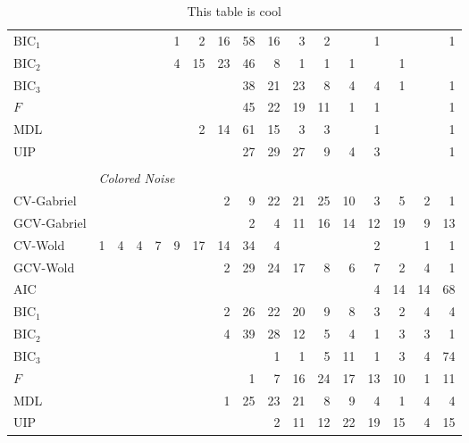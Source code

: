\begin{table}
\begin{tabular}{lrrrrrrrrrrrrrrrr}
 BIC$_1$ &  &  &  &  &  1 &  2 &  16 &  58 &  16 &  3 &  2 &  &  1 &  &  &  1\\ 
 BIC$_2$ &  &  &  &  &  4 &  15 &  23 &  46 &  8 &  1 &  1 &  1 &  &  1 &  & \\ 
 BIC$_3$ &  &  &  &  &  &  &  &  38 &  21 &  23 &  8 &  4 &  4 &  1 &  &  1\\ 
 $F$ &  &  &  &  &  &  &  &  45 &  22 &  19 &  11 &  1 &  1 &  &  &  1\\ 
 MDL &  &  &  &  &  &  2 &  14 &  61 &  15 &  3 &  3 &  &  1 &  &  &  1\\ 
 UIP &  &  &  &  &  &  &  &  27 &  29 &  27 &  9 &  4 &  3 &  &  &  1\\ 
        \\
        &\multicolumn{16}{l}{\scriptsize{\textit{Colored Noise}}} \\
CV-Gabriel &  &  &  &  &  &  &  2 &  9 &  22 &  21 &  25 &  10 &  3 &  5 &  2 &  1\\ 
 GCV-Gabriel &  &  &  &  &  &  &  &  2 &  4 &  11 &  16 &  14 &  12 &  19 &  9 &  13\\ 
 CV-Wold &  1 &  4 &  4 &  7 &  9 &  17 &  14 &  34 &  4 &  &  &  &  2 &  &  1 &  1\\ 
 GCV-Wold &  &  &  &  &  &  &  2 &  29 &  24 &  17 &  8 &  6 &  7 &  2 &  4 &  1\\ 
 AIC &  &  &  &  &  &  &  &  &  &  &  &  &  4 &  14 &  14 &  68\\ 
 BIC$_1$ &  &  &  &  &  &  &  2 &  26 &  22 &  20 &  9 &  8 &  3 &  2 &  4 &  4\\ 
 BIC$_2$ &  &  &  &  &  &  &  4 &  39 &  28 &  12 &  5 &  4 &  1 &  3 &  3 &  1\\ 
 BIC$_3$ &  &  &  &  &  &  &  &  &  1 &  1 &  5 &  11 &  1 &  3 &  4 &  74\\ 
 $F$ &  &  &  &  &  &  &  &  1 &  7 &  16 &  24 &  17 &  13 &  10 &  1 &  11\\ 
 MDL &  &  &  &  &  &  &  1 &  25 &  23 &  21 &  8 &  9 &  4 &  1 &  4 &  4\\ 
 UIP &  &  &  &  &  &  &  &  &  2 &  11 &  12 &  22 &  19 &  15 &  4 &  15\\         
        \bottomrule
    \end{tabular}
    \caption{
        This table is cool
    }
\end{table}


